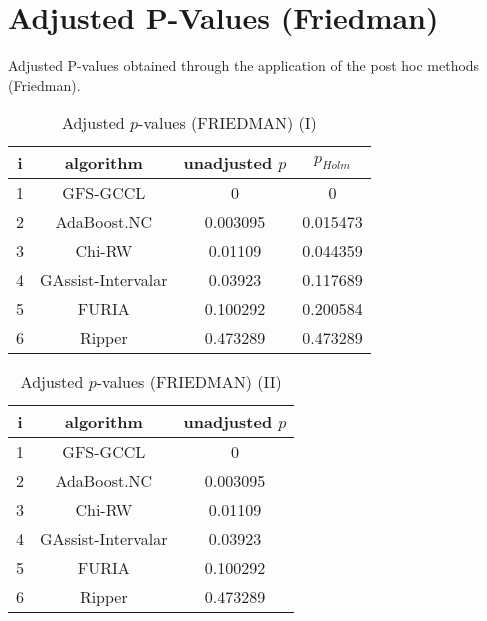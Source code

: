 \documentclass[a4paper,10pt]{article}
\begin{document}
\newpage

\section{Adjusted P-Values (Friedman)}


Adjusted P-values obtained through the application of the post hoc methods (Friedman).

\begin{table}[!htp]
\centering\small
\begin{tabular}{cccc}
i&algorithm&unadjusted $p$&$p_{Holm}$\\
\hline1& GFS-GCCL &0&0\\2& AdaBoost.NC &0.003095&0.015473\\3& Chi-RW &0.01109&0.044359\\4& GAssist-Intervalar &0.03923&0.117689\\5& FURIA &0.100292&0.200584\\6& Ripper&0.473289&0.473289\\\hline
\end{tabular}
\caption{Adjusted $p$-values (FRIEDMAN) (I)}
\end{table}
\begin{table}[!htp]
\centering\small
\begin{tabular}{ccc}
i&algorithm&unadjusted $p$\\
\hline1& GFS-GCCL &0\\2& AdaBoost.NC &0.003095\\3& Chi-RW &0.01109\\4& GAssist-Intervalar &0.03923\\5& FURIA &0.100292\\6& Ripper&0.473289\\\hline
\end{tabular}
\caption{Adjusted $p$-values (FRIEDMAN) (II)}
\end{table}

\newpage
\end{document}
